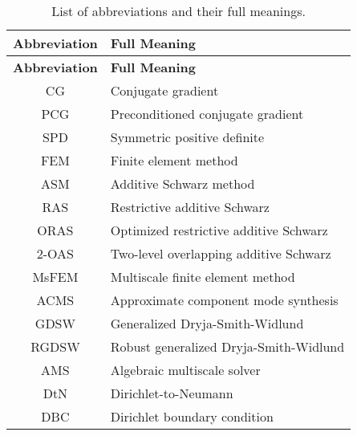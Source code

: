\begin{longtable}{c p{10cm}}
    \caption{List of abbreviations and their full meanings.}\label{tab:abbreviations} \\
    \hline
    \textbf{Abbreviation} & \textbf{Full Meaning}                                     \\
    \hline
    \endfirsthead

    \hline
    \textbf{Abbreviation} & \textbf{Full Meaning}                                     \\
    \hline
    \endhead

    \hline
    \endfoot

    \hline
    \endlastfoot

    CG                    & Conjugate gradient                                        \\
    PCG                   & Preconditioned conjugate gradient                         \\
    SPD                   & Symmetric positive definite                               \\
    FEM                   & Finite element method                                     \\
    ASM                   & Additive Schwarz method                                   \\
    RAS                   & Restrictive additive Schwarz                              \\
    ORAS                  & Optimized restrictive additive Schwarz                    \\
    2-OAS                 & Two-level overlapping additive Schwarz                    \\
    MsFEM                 & Multiscale finite element method                          \\
    ACMS                  & Approximate component mode synthesis                      \\
    GDSW                  & Generalized Dryja-Smith-Widlund                           \\
    RGDSW                 & Robust generalized Dryja-Smith-Widlund                    \\
    AMS                   & Algebraic multiscale solver                               \\
    DtN                   & Dirichlet-to-Neumann                                      \\
    DBC                   & Dirichlet boundary condition                              \\

\end{longtable}
